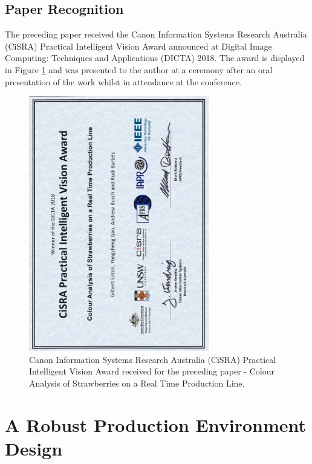 \documentclass[fleqn,twoside,12pt]{report}
\begin{document}
\newpage

\section{Paper Recognition}

The preceding paper received the Canon Information Systems Research Australia (CiSRA) Practical Intelligent Vision Award announced at Digital Image Computing: Techniques and Applications (DICTA) 2018. The award is displayed in Figure \ref{fig:CiSRA} and was presented to the author at a ceremony after an oral presentation of the work whilst in attendance at the conference.   


\begin{figure}[h]
	\centering
	\includegraphics[width=0.7\textwidth,angle=270]{CiSRA.pdf}
	\caption{Canon Information Systems Research Australia (CiSRA) Practical Intelligent Vision Award received for the preceding paper - Colour Analysis of Strawberries on a Real Time Production Line.}
	\label{fig:CiSRA}
\end{figure}




\newpage

\chapter{A Robust Production Environment Design}
\label{sec:III}
\end{document}

